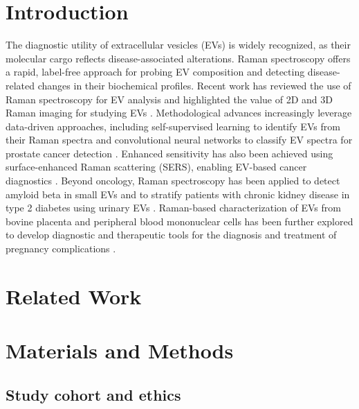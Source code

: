 \documentclass[preprint,12pt]{elsarticle}
\begin{document}


\section{Introduction}

The diagnostic utility of extracellular vesicles (EVs) is widely recognized, as their molecular cargo reflects disease-associated alterations. Raman spectroscopy offers a rapid, label-free approach for probing EV composition and detecting disease-related changes in their biochemical profiles. Recent work has reviewed the use of Raman spectroscopy for EV analysis \cite{liu2025} and highlighted the value of 2D and 3D Raman imaging for studying EVs \cite{horgan2020}. Methodological advances increasingly leverage data-driven approaches, including self-supervised learning to identify EVs from their Raman spectra \cite{jensen2024} and convolutional neural networks to classify EV spectra for prostate cancer detection \cite{lee2020}. Enhanced sensitivity has also been achieved using surface-enhanced Raman scattering (SERS), enabling EV-based cancer diagnostics \cite{koster2021}. Beyond oncology, Raman spectroscopy has been applied to detect amyloid beta in small EVs \cite{imanbekova2021} and to stratify patients with chronic kidney disease in type 2 diabetes using urinary EVs \cite{kaminska2022}. Raman-based characterization of EVs from bovine placenta and peripheral blood mononuclear cells has been further explored to develop diagnostic and therapeutic tools for the diagnosis and treatment of pregnancy complications \cite{zhang2020}.

\section{Related Work}

\color{teal}
\section{Materials and Methods}
\label{sec:methods}

\subsection{Study cohort and ethics}
\label{subsec:cohort}
\end{document}
